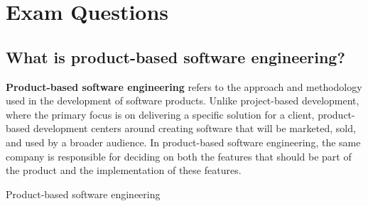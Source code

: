 \chapter{Exam Questions}
\section{What is product-based software engineering?}
\textbf{Product-based software engineering} refers to the approach and methodology used in the development of software products. Unlike project-based development, where the primary focus is on delivering a specific solution for a client, product-based development centers around creating software that will be marketed, sold, and used by a broader audience. In product-based software engineering, the same company is responsible for deciding
on both the features that should be part of the product and the implementation of these
features.

Product-based software engineering